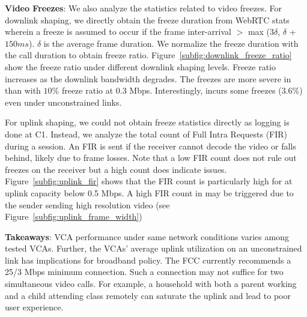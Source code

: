 \textbf{Video Freezes}: We also analyze the statistics related to video freezes. For downlink shaping, we directly obtain the freeze duration from WebRTC stats wherein a freeze is assumed to occur if the frame inter-arrival $>$ max (3$\delta$, $\delta$ + $150 ms$). $\delta$ is the average frame duration. We normalize the freeze duration with the call duration to obtain freeze ratio.  Figure~\ref{subfig:downlink_freeze_ratio} show the freeze ratio under different downlink shaping levels. Freeze ratio increases as the downlink bandwidth degrades. The freezes are more severe in \meet than \teamsbrowser with $10\%$ freeze ratio at 0.3 Mbps. Interestingly, \teamsbrowser incurs some freezes ($3.6\%$) even under unconstrained links. 

For uplink shaping, we could not obtain freeze statistics directly as logging is done at C1. Instead, we analyze the total count of Full Intra Requests (FIR) during a session. An FIR is sent if the receiver cannot decode the video or falls behind, likely due to frame losses. Note that a low FIR count does not rule out freezes on the receiver but a high count does indicate issues. Figure~\ref{subfig:uplink_fir} shows that the FIR count is particularly high for \teamsbrowser at uplink capacity below 0.5 Mbps. A high FIR count in \teamsbrowser may be triggered due to the sender sending high resolution video (see Figure~\ref{subfig:uplink_frame_width})



\textbf{Takeaways}: VCA performance under same network conditions varies among tested VCAs. Further, the VCAs' average uplink utilization on an unconstrained link has implications for broadband policy. The FCC currently recommends a 25/3 Mbps minimum connection. Such a connection may not suffice for two simultaneous video calls. For example, a household with both a parent working and a child attending class remotely can saturate the uplink and lead to poor user experience. 







